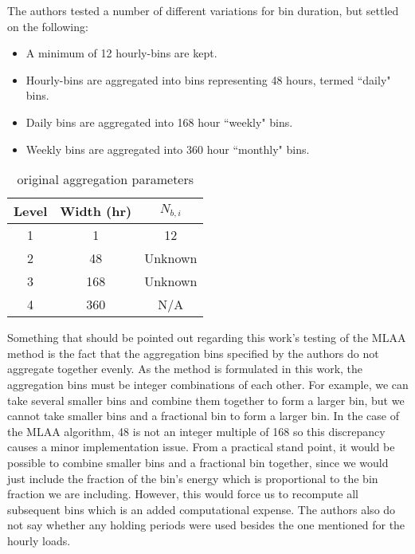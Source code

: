 \documentclass[review,12pt]{elsarticle}
\begin{document}
The authors tested a number of different variations for bin duration, but settled on the following:

\begin{itemize}
    \item A minimum of 12 hourly-bins are kept.

    \item Hourly-bins are aggregated into bins representing 48 hours, termed ``daily" bins.

    \item Daily bins are aggregated into 168 hour ``weekly" bins.

    \item Weekly bins are aggregated into 360 hour ``monthly" bins.

\end{itemize}

\begin{table}[htbp!]
\centering
\caption{\cite{BernierPinelLabibPaillot2004} original aggregation parameters}
\label{tab: MLAA parameters}
\begin{tabular}{|c|c|c|}
\hline
Level & Width (hr) & $N_{b,i}$ \\ \hline \hline
1     & 1          & 12        \\ \hline
2     & 48         & Unknown   \\ \hline
3     & 168        & Unknown   \\ \hline
4     & 360        & N/A       \\ \hline
\end{tabular}
\end{table}

Something that should be pointed out regarding this work's testing of the MLAA method is the fact that the aggregation bins specified by the authors do not aggregate together evenly. As the method is formulated in this work, the aggregation bins must be integer combinations of each other. For example, we can take several smaller bins and combine them together to form a larger bin, but we cannot take smaller bins and a fractional bin to form a larger bin. In the case of the MLAA algorithm, 48 is not an integer multiple of 168 so this discrepancy causes a minor implementation issue. From a practical stand point, it would be possible to combine smaller bins and a fractional bin together, since we would just include the fraction of the bin's energy which is proportional to the bin fraction we are including. However, this would force us to recompute all subsequent bins which is an added computational expense. The authors also do not say whether any holding periods were used besides the one mentioned for the hourly loads.
\end{document}
